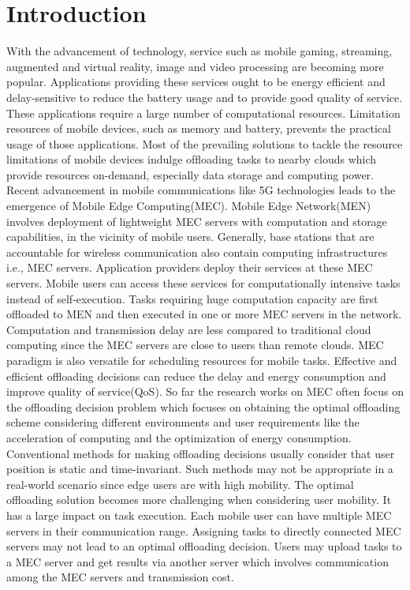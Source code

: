 \documentclass[conference]{IEEEtran}
\begin{document}
\section{Introduction}
With the advancement of technology, service such as mobile gaming, streaming, augmented and virtual reality, image and video processing are becoming more popular. Applications providing these services ought to be energy efficient and delay-sensitive to reduce the battery usage and to provide good quality of service. These applications require a large number of computational resources. Limitation resources of mobile devices, such as memory and battery, prevents the practical usage of those applications.
Most of the prevailing solutions to tackle the resource limitations of mobile devices indulge ofﬂoading tasks to nearby clouds which provide resources on-demand, especially data storage and computing power. Recent advancement in mobile communications like 5G technologies leads to the emergence of Mobile Edge Computing(MEC). Mobile Edge Network(MEN)  involves deployment of lightweight MEC servers with computation and storage capabilities, in the vicinity of mobile users. Generally, base stations that are accountable for wireless communication also contain computing infrastructures i.e., MEC servers. Application providers deploy their services at these MEC servers. Mobile users can access these services for computationally intensive tasks instead of self-execution. Tasks requiring huge computation capacity are first offloaded to MEN and then executed in one or more MEC servers in the network. Computation and transmission delay are less compared to traditional cloud computing since the MEC servers are close to users than remote clouds. MEC paradigm is also versatile for scheduling resources for mobile tasks.
Effective and efficient offloading decisions can reduce the delay and energy consumption and improve quality of service(QoS). So far the research works on MEC often focus on the offloading decision problem which focuses on obtaining the optimal offloading scheme considering different environments and user requirements like the acceleration of computing and the optimization of energy consumption. Conventional methods for making offloading decisions usually consider that user position is static and time-invariant. Such methods may not be appropriate in a real-world scenario since edge users are with high mobility. The optimal offloading solution becomes more challenging when considering user mobility. It has a large impact on task execution. Each mobile user can have multiple MEC servers in their communication range. Assigning tasks to directly connected MEC servers may not lead to an optimal offloading decision. Users may upload tasks to a MEC server and get results via another server which involves communication among the MEC servers and transmission cost. 
\end{document}
